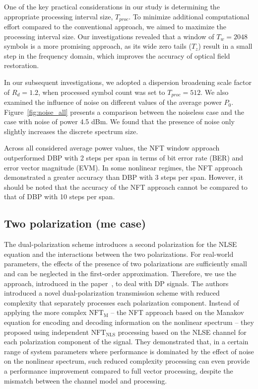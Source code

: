 One of the key practical considerations in our study is determining the appropriate processing interval size, $T_{proc}$. To minimize additional computational effort compared to the conventional approach, we aimed to maximize the processing interval size. Our investigations revealed that a window of $T_w=2048$ symbols is a more promising approach, as its wide zero tails ($T_z$) result in a small step in the frequency domain, which improves the accuracy of optical field restoration.

In our subsequent investigations, we adopted a dispersion broadening scale factor of $R_d=1.2$, when processed symbol count was set to $T_{proc} = 512$. We also examined the influence of noise on different values of the average power $P_0$. Figure~\ref{fig:noise_all} presents a comparison between the noiseless case and the case with noise of power 4.5 dBm. We found that the presence of noise only slightly increases the discrete spectrum size.

Across all considered average power values, the NFT window approach outperformed DBP with 2 steps per span in terms of bit error rate (BER) and error vector magnitude (EVM). In some nonlinear regimes, the NFT approach demonstrated a greater accuracy than DBP with 3 steps per span. However, it should be noted that the accuracy of the NFT approach cannot be compared to that of DBP with 10 steps per span.


\subsection{Two polarization (\acrshort{me} case)}

The dual-polarization scheme introduces a second polarization for the NLSE equation and the interactions between the two polarizations. For real-world parameters, the effects of the presence of two polarizations are sufficiently small and can be neglected in the first-order approximation. Therefore, we use the approach, introduced in the paper~\cite{Civelli2019}, to deal with DP signals.
The authors introduced a novel dual-polarization transmission scheme with reduced complexity that separately processes each polarization component. Instead of applying the more complex $\text{NFT}_\text{M}$ -- the NFT approach based on the Manakov equation for encoding and decoding information on the nonlinear spectrum -- they proposed using independent $\text{NFT}_\text{NLS}$ processing based on the NLSE channel for each polarization component of the signal. They demonstrated that, in a certain range of system parameters where performance is dominated by the effect of noise on the nonlinear spectrum, such reduced complexity processing can even provide a performance improvement compared to full vector processing, despite the mismatch between the channel model and processing.

